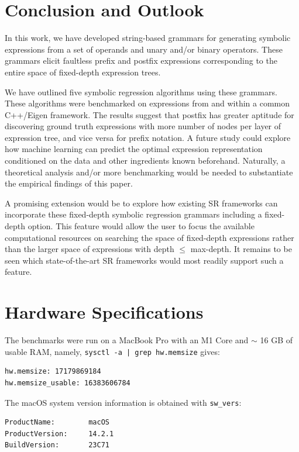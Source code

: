 \documentclass[runningheads]{llncs}
\begin{document}
\section{Conclusion and Outlook}
In this work, we have developed string-based grammars for generating symbolic expressions from a set of operands and unary and/or binary operators. These grammars elicit faultless prefix and postfix expressions corresponding to the entire space of fixed-depth expression trees. 
\par We have outlined five symbolic regression algorithms using these grammars. These algorithms were benchmarked on expressions from \cite{hemberg2008pre} and \cite{udrescu2020ai} within a common C++/Eigen framework. The results suggest that postfix has greater aptitude for discovering ground truth expressions with more number of nodes per layer of expression tree, and vice versa for prefix notation. A future study could explore how machine learning can predict the optimal expression representation conditioned on the data and other ingredients known beforehand. Naturally, a theoretical analysis and/or more benchmarking would be needed to substantiate the empirical findings of this paper. 
\par A promising extension would be to explore how existing SR frameworks can incorporate these fixed-depth symbolic regression grammars including a fixed-depth option. This feature would allow the user to focus the available computational resources on searching the space of fixed-depth expressions rather than the larger space of expressions with depth $\leq$ max-depth. It remains to be seen which state-of-the-art SR frameworks would most readily support such a feature.



\nocite{cholewiak2021scholarly}

\appendix
\section{Hardware Specifications}
The benchmarks were run on a MacBook Pro with an M1 Core and $\sim$ 16 GB of usable RAM, namely, \texttt{sysctl -a | grep hw.memsize} gives: 
\begin{verbatim}
hw.memsize: 17179869184
hw.memsize_usable: 16383606784
\end{verbatim}
The macOS system version information is obtained with \texttt{sw\_vers}:
\begin{verbatim}
ProductName:		macOS
ProductVersion:		14.2.1
BuildVersion:		23C71
\end{verbatim}
\end{document}
